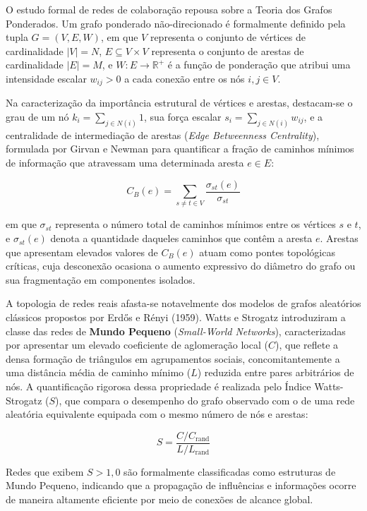 \documentclass[conference]{IEEEtran}
\begin{document}
O estudo formal de redes de colaboração repousa sobre a Teoria dos Grafos Ponderados. Um grafo ponderado não-direcionado é formalmente definido pela tupla $G = (V, E, W)$, em que $V$ representa o conjunto de vértices de cardinalidade $|V| = N$, $E \subseteq V \times V$ representa o conjunto de arestas de cardinalidade $|E| = M$, e $W: E \to \mathbb{R}^+$ é a função de ponderação que atribui uma intensidade escalar $w_{ij} > 0$ a cada conexão entre os nós $i, j \in V$. 

Na caracterização da importância estrutural de vértices e arestas, destacam-se o grau de um nó $k_i = \sum_{j \in N(i)} 1$, sua força escalar $s_i = \sum_{j \in N(i)} w_{ij}$, e a centralidade de intermediação de arestas (\textit{Edge Betweenness Centrality}), formulada por Girvan e Newman \cite{girvan2002} para quantificar a fração de caminhos mínimos de informação que atravessam uma determinada aresta $e \in E$:

\begin{equation}
C_B(e) = \sum_{s \neq t \in V} \frac{\sigma_{st}(e)}{\sigma_{st}}
\end{equation}

em que $\sigma_{st}$ representa o número total de caminhos mínimos entre os vértices $s$ e $t$, e $\sigma_{st}(e)$ denota a quantidade daqueles caminhos que contêm a aresta $e$. Arestas que apresentam elevados valores de $C_B(e)$ atuam como pontes topológicas críticas, cuja desconexão ocasiona o aumento expressivo do diâmetro do grafo ou sua fragmentação em componentes isolados.

A topologia de redes reais afasta-se notavelmente dos modelos de grafos aleatórios clássicos propostos por Erdős e Rényi (1959). Watts e Strogatz \cite{watts1998} introduziram a classe das redes de \textbf{Mundo Pequeno} (\textit{Small-World Networks}), caracterizadas por apresentar um elevado coeficiente de aglomeração local ($C$), que reflete a densa formação de triângulos em agrupamentos sociais, concomitantemente a uma distância média de caminho mínimo ($L$) reduzida entre pares arbitrários de nós. A quantificação rigorosa dessa propriedade é realizada pelo Índice Watts-Strogatz ($S$), que compara o desempenho do grafo observado com o de uma rede aleatória equivalente equipada com o mesmo número de nós e arestas:

\begin{equation}
S = \frac{C / C_{\text{rand}}}{L / L_{\text{rand}}}
\end{equation}

Redes que exibem $S > 1,0$ são formalmente classificadas como estruturas de Mundo Pequeno, indicando que a propagação de influências e informações ocorre de maneira altamente eficiente por meio de conexões de alcance global.
\end{document}
